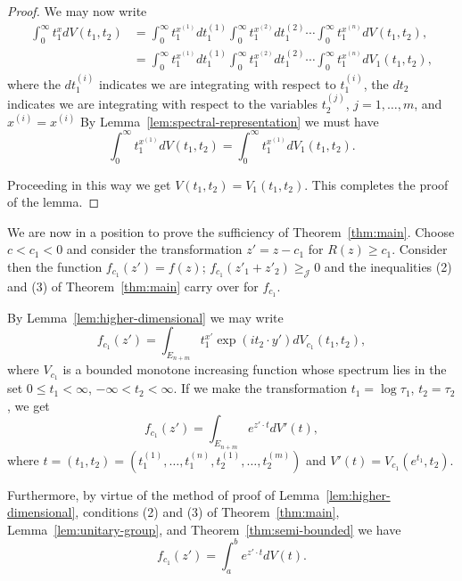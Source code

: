 \documentclass{article}
\begin{document}
\begin{proof}
We may now write
\begin{align}
\int_0^{\infty} t_1^x dV(t_1, t_2) &= \int_0^{\infty} t_1^{x^{(1)}} dt_1^{(1)} \int_0^{\infty} t_1^{x^{(2)}} dt_1^{(2)} \cdots \int_0^{\infty} t_1^{x^{(n)}} dV(t_1, t_2), \\
&= \int_0^{\infty} t_1^{x^{(1)}} dt_1^{(1)} \int_0^{\infty} t_1^{x^{(2)}} dt_1^{(2)} \cdots \int_0^{\infty} t_1^{x^{(n)}} dV_1(t_1, t_2),
\label{eq:uniqueness-step4}
\end{align}
where the $dt_1^{(i)}$ indicates we are integrating with respect to $t_1^{(i)}$, the $dt_2$ indicates we are integrating with respect to the variables $t_2^{(j)}$, $j = 1, \ldots, m$, and $x^{(i)} = x^{(i)}$ By Lemma~\ref{lem:spectral-representation} we must have
\begin{equation}
\int_0^{\infty} t_1^{x^{(1)}} dV(t_1, t_2) = \int_0^{\infty} t_1^{x^{(1)}} dV_1(t_1, t_2).
\label{eq:uniqueness-step5}
\end{equation}

Proceeding in this way we get $V(t_1, t_2) = V_1(t_1, t_2)$. This completes the proof of the lemma.
\end{proof}

We are now in a position to prove the sufficiency of Theorem~\ref{thm:main}. Choose $c < c_1 < 0$ and consider the transformation $z' = z - c_1$ for $R(z) \geq c_1$. Consider then the function $f_{c_1}(z') = f(z)$; $f_{c_1}(z'_1 + z'_2) \geq_{\mathcal{J}} 0$ and the inequalities (2) and (3) of Theorem~\ref{thm:main} carry over for $f_{c_1}$.

By Lemma~\ref{lem:higher-dimensional} we may write
\begin{equation}
f_{c_1}(z') = \int_{E_{n+m}} t_1^{x'} \exp(i t_2 \cdot y') dV_{c_1}(t_1, t_2),
\label{eq:sufficiency-step1}
\end{equation}
where $V_{c_1}$ is a bounded monotone increasing function whose spectrum lies in the set $0 \leq t_1 < \infty$, $-\infty < t_2 < \infty$. If we make the transformation $t_1 = \log \tau_1$, $t_2 = \tau_2$, we get
\begin{equation}
f_{c_1}(z') = \int_{E_{n+m}} e^{z' \cdot t} dV'(t),
\label{eq:sufficiency-step2}
\end{equation}
where $t = (t_1, t_2) = (t_1^{(1)}, \ldots, t_1^{(n)}, t_2^{(1)}, \ldots, t_2^{(m)})$ and $V'(t) = V_{c_1}(e^{t_1}, t_2)$.

Furthermore, by virtue of the method of proof of Lemma~\ref{lem:higher-dimensional}, conditions (2) and (3) of Theorem~\ref{thm:main}, Lemma~\ref{lem:unitary-group}, and Theorem~\ref{thm:semi-bounded} we have
\begin{equation}
f_{c_1}(z') = \int_a^b e^{z' \cdot t} dV(t).
\label{eq:sufficiency-step3}
\end{equation}
\end{document}
